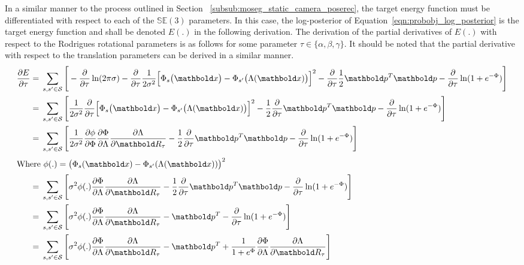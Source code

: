 In a similar manner to the process outlined in Section
~\ref{subsub:moseg_static_camera_poserec}, the target energy function must be
differentiated with respect to each of the \(\mathbb{SE}(3)\) parameters. In this
case, the log-posterior of Equation~\ref{eqn:probobj_log_posterior} is the
target energy function and shall be denoted \(E(.)\) in the following derivation.
The derivation of the partial derivatives of \(E(.)\) with respect
to the Rodrigues rotational parameters is as follows for some parameter
\( \tau \in \{ \alpha, \beta, \gamma \} \). It should be noted that the partial 
derivative with respect to the translation parameters can be derived in a similar 
manner.
\begin{align}
  \label{eqn:probobj_log_post_rot_grad}
  \frac{\partial E}{\partial \tau} ={}&
  \sum_{s, s' \in \mathcal{S}} \Bigg[ - \frac{\partial}{\partial \tau}
  \ln(2\pi\sigma) - \frac{\partial}{\partial \tau}
  \frac{1}{2\sigma^{2}}{\Big[\Phi_{s}\big(\bm{x}\big) -
  \Phi_{s'}\big(\Lambda(\bm{x})\big)\Big]}^{2} -
  \frac{\partial}{\partial \tau} \frac{1}{2} \bm{p}^{T}\bm{p} -
  \frac{\partial}{\partial \tau} \ln(1 + e^{-\Phi})
  \Bigg]\\
  ={}& \sum_{s, s' \in \mathcal{S}} \Bigg[ \frac{1}{2\sigma^{2}}
  \frac{\partial}{\partial \tau}
  {\Big[\Phi_{s}\big(\bm{x}\big) - \Phi_{s'}\big(\Lambda(\bm{x})\big)\Big]}^{2} -
  \frac{1}{2} \frac{\partial}{\partial \tau}
  \bm{p}^{T}\bm{p} - \frac{\partial}{\partial \tau} \ln(1 + e^{-\Phi})
  \Bigg]\\
  ={}& \sum_{s, s' \in \mathcal{S}} \Bigg[ \frac{1}{2\sigma^{2}}
  \frac{\partial \phi}{\partial \Phi} \frac{\partial \Phi}{\partial \Lambda}
  \frac{\partial \Lambda}{\partial \bm{R}_{\tau}} -
  \frac{1}{2} \frac{\partial}{\partial \tau}
  \bm{p}^{T}\bm{p} - \frac{\partial}{\partial \tau} \ln(1 + e^{-\Phi})
  \Bigg]\\
  \shortintertext{Where \(\phi(.) =
  {\big(\Phi_{s}(\bm{x}) - \Phi_{s'}(\Lambda(\bm{x}))\big)}^{2}\)}
  ={}& \sum_{s, s' \in \mathcal{S}} \Bigg[ \sigma^{2} \phi(.)
  \frac{\partial \Phi}{\partial \Lambda}
  \frac{\partial \Lambda}{\partial \bm{R}_{\tau}} -
  \frac{1}{2} \frac{\partial}{\partial \tau}
  \bm{p}^{T}\bm{p} - \frac{\partial}{\partial \tau} \ln(1 + e^{-\Phi})
  \Bigg]\\
  ={}& \sum_{s, s' \in \mathcal{S}} \Bigg[ \sigma^{2} \phi(.)
  \frac{\partial \Phi}{\partial \Lambda}
  \frac{\partial \Lambda}{\partial \bm{R}_{\tau}} - \bm{p}^{T} -
  \frac{\partial}{\partial \tau} \ln(1 + e^{-\Phi})
    \Bigg]\\
  ={}& \sum_{s, s' \in \mathcal{S}} \Bigg[ \sigma^{2} \phi(.)
  \frac{\partial \Phi}{\partial \Lambda}
  \frac{\partial \Lambda}{\partial \bm{R}_{\tau}} - \bm{p}^{T} +
  \frac{1}{1 + e^{\Phi}} \frac{\partial \Phi}{\partial \Lambda}
  \frac{\partial \Lambda}{\partial \bm{R}_{\tau}} \Bigg]
\end{align}


